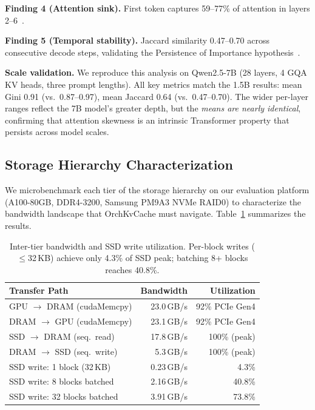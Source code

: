 \documentclass[conference]{IEEEtran}
\begin{document}
\textbf{Finding 4 (Attention sink).} First token captures 59--77\% of attention in layers 2--6~\cite{streamingllm}.

\textbf{Finding 5 (Temporal stability).} Jaccard similarity 0.47--0.70 across consecutive decode steps, validating the Persistence of Importance hypothesis~\cite{scissorhands}.

\textbf{Scale validation.} We reproduce this analysis on Qwen2.5-7B (28 layers, 4 GQA KV heads, three prompt lengths). All key metrics match the 1.5B results: mean Gini 0.91 (vs.\ 0.87--0.97), mean Jaccard 0.64 (vs.\ 0.47--0.70). The wider per-layer ranges reflect the 7B model's greater depth, but the \emph{means are nearly identical}, confirming that attention skewness is an intrinsic Transformer property that persists across model scales.

\subsection{Storage Hierarchy Characterization}
\label{sec:storage-char}

We microbenchmark each tier of the storage hierarchy on our evaluation platform (A100-80GB, DDR4-3200, Samsung PM9A3 NVMe RAID0) to characterize the bandwidth landscape that OrchKvCache must navigate. Table~\ref{tab:storage-char} summarizes the results.

\begin{table}[t]
\centering
\caption{Inter-tier bandwidth and SSD write utilization. Per-block writes ($\leq$32\,KB) achieve only 4.3\% of SSD peak; batching 8+ blocks reaches 40.8\%.}
\label{tab:storage-char}
\small
\begin{tabular}{@{}lrr@{}}
\toprule
Transfer Path & Bandwidth & Utilization \\
\midrule
GPU $\to$ DRAM (cudaMemcpy) & 23.0\,GB/s & 92\% PCIe Gen4 \\
DRAM $\to$ GPU (cudaMemcpy) & 23.1\,GB/s & 92\% PCIe Gen4 \\
SSD $\to$ DRAM (seq.\ read)  & 17.8\,GB/s & 100\% (peak) \\
DRAM $\to$ SSD (seq.\ write) & 5.3\,GB/s & 100\% (peak) \\
\midrule
SSD write: 1 block (32\,KB)  & 0.23\,GB/s & 4.3\% \\
SSD write: 8 blocks batched  & 2.16\,GB/s & 40.8\% \\
SSD write: 32 blocks batched & 3.91\,GB/s & 73.8\% \\
\bottomrule
\end{tabular}
\end{table}
\end{document}
